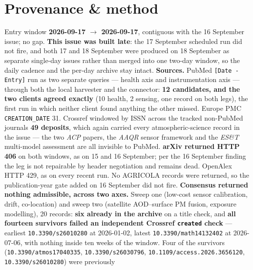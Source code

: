 \documentclass[10pt]{article}
\begin{document}
\clearpage

\section*{\sffamily\bfseries\color{Deep}Provenance \& method}
\vspace{-1.5mm}{\color{Amber}\rule{\linewidth}{1.1pt}}\vspace{2.5mm}

\begin{keybox}
{\fontsize{7.2}{8.8}\selectfont
Entry window \textbf{2026-09-17 $\to$ 2026-09-17}, contiguous with the 16 September issue;
no gap. \textbf{This issue was built late}: the 17 September scheduled run did not fire, and
both 17 and 18 September were produced on 18 September as separate single-day issues rather
than merged into one two-day window, so the daily cadence and the per-day archive stay
intact.
\textbf{Sources.} PubMed \texttt{[Date - Entry]} run as two separate queries --- health axis
and instrumentation axis --- through both the local harvester and the connector:
\textbf{12 candidates, and the two clients agreed exactly} (10 health, 2 sensing, one record
on both legs), the first run in which neither client found anything the other missed.
Europe PMC \texttt{CREATION\_DATE} 31. Crossref windowed by ISSN across the tracked
non-PubMed journals \textbf{49 deposits}, which again carried every atmospheric-science
record in the issue --- the two \textit{ACP} papers, the \textit{AAQR} sensor framework and
the \textit{ES\&T} multi-model assessment are all invisible to PubMed. \textbf{arXiv
returned HTTP 406} on both windows, as on 15 and 16 September; per the 16 September finding
the leg is not repairable by header negotiation and remains dead. OpenAlex HTTP 429, as on
every recent run. No AGRICOLA records were returned, so the publication-year gate added on
16 September did not fire.
\textbf{Consensus returned nothing admissible, across two axes.} Sweep one (low-cost sensor
calibration, drift, co-location) and sweep two (satellite AOD--surface PM fusion, exposure
modelling), 20 records: \textbf{six already in the archive} on a title check, and
\textbf{all fourteen survivors failed an independent Crossref \texttt{created} check} ---
earliest \texttt{10.3390/s26010280} at 2026-01-02, latest \texttt{10.3390/math14132402} at
2026-07-06, with nothing inside ten weeks of the window. Four of the survivors
(\texttt{10.3390/atmos17040335}, \texttt{10.3390/s26030796},
\texttt{10.1109/access.2026.3656120}, \texttt{10.3390/s26010280}) were previously
}
\end{keybox}
\end{document}
